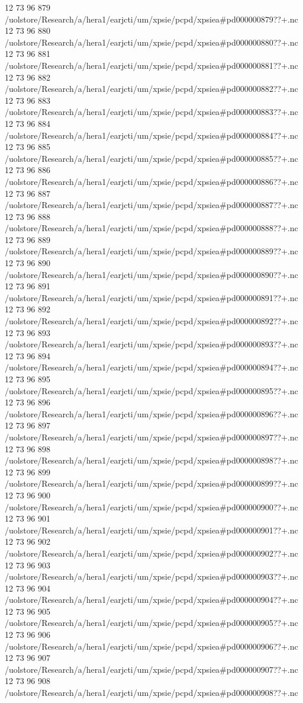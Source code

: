 12 73 96
879
/uolstore/Research/a/hera1/earjcti/um/xpsie/pcpd/xpsiea#pd000000879??+.nc
12 73 96
880
/uolstore/Research/a/hera1/earjcti/um/xpsie/pcpd/xpsiea#pd000000880??+.nc
12 73 96
881
/uolstore/Research/a/hera1/earjcti/um/xpsie/pcpd/xpsiea#pd000000881??+.nc
12 73 96
882
/uolstore/Research/a/hera1/earjcti/um/xpsie/pcpd/xpsiea#pd000000882??+.nc
12 73 96
883
/uolstore/Research/a/hera1/earjcti/um/xpsie/pcpd/xpsiea#pd000000883??+.nc
12 73 96
884
/uolstore/Research/a/hera1/earjcti/um/xpsie/pcpd/xpsiea#pd000000884??+.nc
12 73 96
885
/uolstore/Research/a/hera1/earjcti/um/xpsie/pcpd/xpsiea#pd000000885??+.nc
12 73 96
886
/uolstore/Research/a/hera1/earjcti/um/xpsie/pcpd/xpsiea#pd000000886??+.nc
12 73 96
887
/uolstore/Research/a/hera1/earjcti/um/xpsie/pcpd/xpsiea#pd000000887??+.nc
12 73 96
888
/uolstore/Research/a/hera1/earjcti/um/xpsie/pcpd/xpsiea#pd000000888??+.nc
12 73 96
889
/uolstore/Research/a/hera1/earjcti/um/xpsie/pcpd/xpsiea#pd000000889??+.nc
12 73 96
890
/uolstore/Research/a/hera1/earjcti/um/xpsie/pcpd/xpsiea#pd000000890??+.nc
12 73 96
891
/uolstore/Research/a/hera1/earjcti/um/xpsie/pcpd/xpsiea#pd000000891??+.nc
12 73 96
892
/uolstore/Research/a/hera1/earjcti/um/xpsie/pcpd/xpsiea#pd000000892??+.nc
12 73 96
893
/uolstore/Research/a/hera1/earjcti/um/xpsie/pcpd/xpsiea#pd000000893??+.nc
12 73 96
894
/uolstore/Research/a/hera1/earjcti/um/xpsie/pcpd/xpsiea#pd000000894??+.nc
12 73 96
895
/uolstore/Research/a/hera1/earjcti/um/xpsie/pcpd/xpsiea#pd000000895??+.nc
12 73 96
896
/uolstore/Research/a/hera1/earjcti/um/xpsie/pcpd/xpsiea#pd000000896??+.nc
12 73 96
897
/uolstore/Research/a/hera1/earjcti/um/xpsie/pcpd/xpsiea#pd000000897??+.nc
12 73 96
898
/uolstore/Research/a/hera1/earjcti/um/xpsie/pcpd/xpsiea#pd000000898??+.nc
12 73 96
899
/uolstore/Research/a/hera1/earjcti/um/xpsie/pcpd/xpsiea#pd000000899??+.nc
12 73 96
900
/uolstore/Research/a/hera1/earjcti/um/xpsie/pcpd/xpsiea#pd000000900??+.nc
12 73 96
901
/uolstore/Research/a/hera1/earjcti/um/xpsie/pcpd/xpsiea#pd000000901??+.nc
12 73 96
902
/uolstore/Research/a/hera1/earjcti/um/xpsie/pcpd/xpsiea#pd000000902??+.nc
12 73 96
903
/uolstore/Research/a/hera1/earjcti/um/xpsie/pcpd/xpsiea#pd000000903??+.nc
12 73 96
904
/uolstore/Research/a/hera1/earjcti/um/xpsie/pcpd/xpsiea#pd000000904??+.nc
12 73 96
905
/uolstore/Research/a/hera1/earjcti/um/xpsie/pcpd/xpsiea#pd000000905??+.nc
12 73 96
906
/uolstore/Research/a/hera1/earjcti/um/xpsie/pcpd/xpsiea#pd000000906??+.nc
12 73 96
907
/uolstore/Research/a/hera1/earjcti/um/xpsie/pcpd/xpsiea#pd000000907??+.nc
12 73 96
908
/uolstore/Research/a/hera1/earjcti/um/xpsie/pcpd/xpsiea#pd000000908??+.nc

